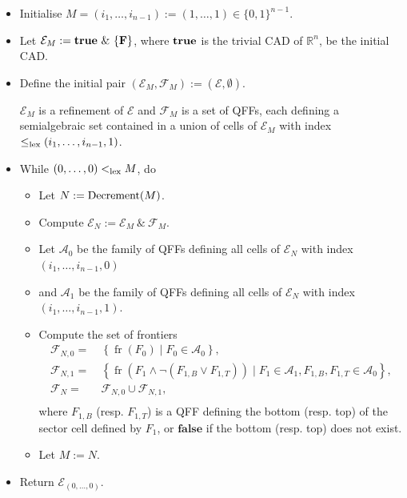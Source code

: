 \documentclass[
]{book}
\theoremstyle{definition}
\theoremstyle{definition}
\theoremstyle{definition}
\theoremstyle{definition}
\theoremstyle{remark}
\begin{document}
\begin{itemize}
\item
  Initialise \(M = (i_1,\ldots,i_{n-1}) := (1,\ldots,1) \in \{0,1\}^{n-1}\).
\item
  Let \(\mathcal{E}_M := \bf{true} \ \&\ \{ F \}\), where \(\bf{true}\) is the trivial CAD of \(\mathbb{R}^n\), be the initial CAD.
\item
  Define the initial pair
  \(({\mathcal E}_M, \mathcal{F}_M):=({\mathcal E}, \emptyset)\).

  \(\mathcal{E}_M\) is a refinement of \(\mathcal{E}\) and \(\mathcal{F}_M\) is a set of QFFs, each defining a semialgebraic set contained in a union of cells of \(\mathcal{E}_M\) with index \(\le_{\rm{lex}}(i_1,\ldots,i_{n-1},1)\).
\item
  While \((0,\ldots,0) <_{\rm{lex}}M\), do

  \begin{itemize}
  \item
    Let \(N := {\rm Decrement} (M)\).
  \item
    Compute \(\mathcal{E}_N := \mathcal{E}_M\ \&\ {\mathcal F}_M\).
  \item
    Let \(\mathcal{A}_0\) be the family of QFFs defining all cells of \(\mathcal{E}_N\) with index \((i_1,\ldots,i_{n-1},0)\)
  \item
    and \(\mathcal{A}_1\) be the family of QFFs defining all cells of \(\mathcal{E}_N\) with index \((i_1,\ldots,i_{n-1},1)\).
  \item
    Compute the set of frontiers
    \begin{align*}
    {\mathcal F}_{N,0} =\ & \left\{ {\operatorname{fr} \left( F_0 \right)} \mid F_0 \in \mathcal{A}_0 \right\}, \\
    {\mathcal F}_{N,1} =\ & \left\{ {\operatorname{fr} \left( F_1 \land \neg( F_{1,B} \lor F_{1,T} ) \right)} \mid F_1 \in \mathcal{A}_1, F_{1,B}, F_{1,T} \in \mathcal{A}_0 \right\}, \\
    {\mathcal F}_N =\ & {\mathcal F}_{N,0} \cup {\mathcal F}_{N,1}, \\
    \end{align*}
    where \(F_{1,B}\) (resp. \(F_{1,T}\)) is a QFF defining the bottom (resp. top) of the sector cell defined by \(F_1\), or \(\mathbf{false}\) if the bottom (resp. top) does not exist.
  \item
    Let \(M := N\).
  \end{itemize}
\item
  Return \({\mathcal E}_{(0,\ldots,0)}\).
\end{itemize}
\end{document}
